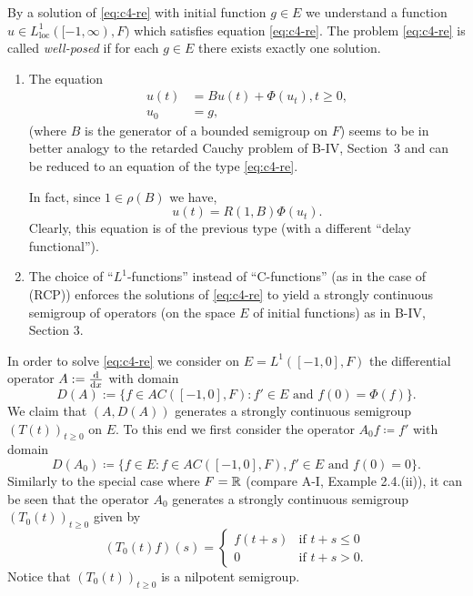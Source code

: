 By a solution of \eqref{eq:c4-re} with initial function $g \in E$ we understand a function $u \in L^{1}_{\mathrm{loc}}([-1,\infty),F)$ which satisfies equation \eqref{eq:c4-re}.
The problem \eqref{eq:c4-re} is called \emph{well-posed} if for each $g \in E$ there exists exactly one solution.
\begin{remarks*}
\begin{enumerate}[\upshape (i), wide, labelindent=.5em] 
\item \label{rem:c4-kgk-1}
The equation
\begin{align*}
u(t) &= Bu(t) + \Phi(u_t), t \geq 0,\\
u_0 &= g,
\end{align*}
(where $B$ is the generator of a bounded semigroup on $F$) seems to be in better analogy to the retarded Cauchy problem of B-IV, Section~3 and can be reduced to an equation of the type \eqref{eq:c4-re}.

In fact, since $1 \in \rho(B)$ we have,
\begin{equation*}\label{eq:c4-3.0-KGK1}
u(t) = R(1,B)\Phi(u_{t}).
\end{equation*}
Clearly, this equation is of the previous type (with a different \enquote{delay functional}).
\item \label{rem:c4-kgk-2}
The choice of \enquote{$L^{1}$-functions} instead of \enquote{C-functions} (as in the case of (RCP)) enforces the solutions of \eqref{eq:c4-re} to yield a strongly continuous semigroup of operators (on the space $E$ of initial functions) as in B-IV, Section 3.
\end{enumerate}
\end{remarks*}
In order to solve \eqref{eq:c4-re} we consider on $E = L^{1}([-1,0],F)$ the differential operator $A := \frac{\mathop{}\!\mathrm{d}{}}{\mathop{}\!\mathrm{d}{x}}$ with domain
\begin{equation*}\label{eq:c4-3.0-KGK2}
D(A):=\{f \in AC([-1,0],F) \colon f' \in E \text{ and } f(0) = \Phi(f)\}.
\end{equation*}
We claim that $(A,D(A))$ generates a strongly continuous semigroup $(T(t))_{t\geq 0}$ on $E$.
To this end we first consider the operator $A_0 f \coloneqq f'$ with domain
\begin{equation*}\label{eq:c4-3.0-KGK3}
D(A_0) \coloneqq \{f \in E \colon f \in AC([-1,0],F), f' \in E \text{ and } f(0) = 0\}.
\end{equation*}
Similarly to the special case where $F = \mathbb{R}$ (compare A-I, Example 2.4.(ii)), it can be seen that the operator $A_0$ generates a strongly continuous semigroup $(T_0(t))_{t\geq 0}$ given by
\begin{equation}\label{eq:c4-3.1}
(T_0(t)f)(s) = \begin{cases}
    f(t+s) & \text{if } t+s \leq 0 \\
    0 & \text{if } t+s > 0.
\end{cases}
\end{equation}
Notice that $(T_0(t))_{t \geq 0}$ is a nilpotent semigroup.

